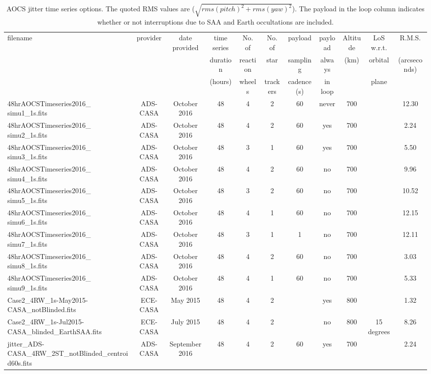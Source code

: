 \documentclass[11pt]{article}      %
\begin{document}
\begin{table}[hb]
  \caption{AOCS jitter time series options. The quoted RMS values are ($\sqrt{rms(pitch)^2+rms(yaw)^2}$). The payload in the loop column indicates whether or not interruptions due to SAA and Earth occultations are included.}

  \begin{tabular}{| l | c | c | c | c  | c | c | c | c | c | c |}
    \hline
    filename & provider & date provided & time series & No. of & No. of & payload & payload & Altitude & LoS w.r.t.  & R.M.S. \\
    & & & duration & reaction& star & sampling & always & (km) & orbital & (arcseconds) \\
    & & & (hours) & wheels & trackers & cadence (s) & in loop & & plane & \\
\hline
    48hrAOCSTimeseries2016\_ simu1\_1s.fits & ADS-CASA & October 2016 & 48 & 4 & 2 & 60 & never & 700 & & 12.30 \\
    48hrAOCSTimeseries2016\_ simu2\_1s.fits & ADS-CASA & October 2016 & 48 & 4 & 2 & 60 & yes & 700 & & 2.24 \\
    48hrAOCSTimeseries2016\_ simu3\_1s.fits & ADS-CASA & October 2016 & 48 & 3 & 1 & 60 & yes & 700 & & 5.50 \\
    48hrAOCSTimeseries2016\_ simu4\_1s.fits & ADS-CASA & October 2016 & 48 & 4 & 2 & 60 & no & 700 & & 9.96 \\
    48hrAOCSTimeseries2016\_ simu5\_1s.fits & ADS-CASA & October 2016 & 48 & 3 & 2 & 60 & no & 700 & & 10.52 \\
    48hrAOCSTimeseries2016\_ simu6\_1s.fits & ADS-CASA & October 2016 & 48 & 4 & 1 & 60 & no & 700 & & 12.15 \\
    48hrAOCSTimeseries2016\_ simu7\_1s.fits & ADS-CASA & October 2016 & 48 & 3 & 1 & 1 & no & 700 & & 12.11 \\
    48hrAOCSTimeseries2016\_ simu8\_1s.fits & ADS-CASA & October 2016 & 48 & 4 & 2 & 60 & no & 700 & & 3.03 \\
    48hrAOCSTimeseries2016\_ simu9\_1s.fits & ADS-CASA & October 2016 & 48 & 4 & 1 & 60 & no & 700 & & 5.33 \\
    Case2\_4RW\_1s-May2015-CASA\_notBlinded.fits & ECE-CASA & May 2015 & 48 & 4 & 2 & & yes & 800 & & 1.32 \\
    Case2\_4RW\_1s-Jul2015-CASA\_blinded\_EarthSAA.fits & ECE-CASA & July 2015 & 48 & 4 & 2 & & no & 800 & 15 degrees & 8.26 \\
     jitter\_ADS-CASA\_4RW\_2ST\_notBlinded\_centroid60s.fits & ADS-CASA & September 2016 & 48 & 4 & 2 & 60 & yes & 700 & & 2.24 \\

\end{tabular}
\end{table}
\end{document}
